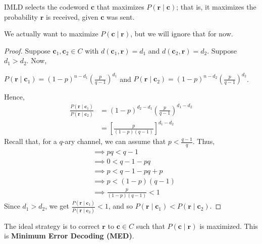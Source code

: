 \begin{thmbox}
    \begin{theorem}
        IMLD selects the codeword $ \bm{c} $ that maximizes $ P(\bm{r}\mid \bm{c})$; that is,
        it maximizes the probability $ \bm{r} $ is received, given $ \bm{c} $ was sent.
    \end{theorem} \end{thmbox}
We actually want to maximize $ P(\bm{c}\mid \bm{r}) $, but we will ignore that for now.
\begin{proof}
    Suppose $ \bm{c}_1,\bm{c}_2\in C $ with $ d(\bm{c}_1,\bm{r})=d_1 $
    and $ d(\bm{c}_2,\bm{r})=d_2 $.
    Suppose $ d_1>d_2 $. Now,

    $ P(\bm{r}\mid \bm{c}_1)=(1-p)^{n-d_1}\left( \frac{p}{q-1} \right)^{d_1} $ and
    $ P(\bm{r}\mid \bm{c}_2)=(1-p)^{n-d_2}\left( \frac{p}{q-1} \right)^{d_2} $.

    Hence,
    \begin{align*}
        \frac{P(\bm{r}\mid \bm{c}_1)}{P(\bm{r}\mid \bm{c}_2)}
         & =(1-p)^{d_2-d_1}\left( \frac{p}{q-1}  \right)^{d_1-d_2} \\
         & =\left[ \frac{p}{(1-p)(q-1)}  \right]^{d_1-d_2}
    \end{align*}
    Recall that, for a $ q $-ary channel, we can assume that $ p<\frac{q-1}{q} $. Thus,
    \begin{align*}
         & \implies pq < q-1                 \\
         & \implies 0 < q-1-pq               \\
         & \implies p < q-1-pq+p             \\
         & \implies p < (1-p)(q-1)           \\
         & \implies \frac{p}{(1-p)(q-1)} < 1
    \end{align*}
    Since $ d_1>d_2 $, we get $ \frac{P(\bm{r}\mid \bm{c}_1)}{P(\bm{r}\mid \bm{c}_2)} < 1 $, and so
    $ P(\bm{r}\mid \bm{c}_1)<P(\bm{r}\mid \bm{c}_2) $.
\end{proof}
The ideal strategy is to correct $ \bm{r} $ to $ \bm{c}\in C $ such that
$ P(\bm{c}\mid \bm{r}) $ is maximized. This is \textbf{Minimum Error Decoding (MED)}.

